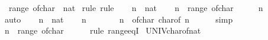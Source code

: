\begin{isabellebody}
\ \ {\isachardoublequoteopen}range\ of{\isacharunderscore}{\kern0pt}char\ {\isacharequal}{\kern0pt}\ {\isacharbraceleft}{\kern0pt}{}{\isacharcolon}{\kern0pt}{\isacharcolon}{\kern0pt}nat{\isachardot}{\kern0pt}{\isachardot}{\kern0pt}{\isacharless}{\kern0pt}{}{}{}{\isacharbraceright}{\kern0pt}{\isachardoublequoteclose}\isanewline
%
\isadelimproof
%
\endisadelimproof
%
\isatagproof
{}\isamarkupfalse%
\ {\isacharparenleft}{\kern0pt}rule{\isacharsemicolon}{\kern0pt}\ rule{\isacharparenright}{\kern0pt}\isanewline
\ \ \isamarkupfalse%
\ n\ {\isacharcolon}{\kern0pt}{\isacharcolon}{\kern0pt}\ nat\isanewline
\ \ \isamarkupfalse%
\ {\isachardoublequoteopen}n\ {\isasymin}\ range\ of{\isacharunderscore}{\kern0pt}char{\isachardoublequoteclose}\isanewline
\ \ \isamarkupfalse%
\ \isamarkupfalse%
\ {\isachardoublequoteopen}n\ {\isasymin}\ {\isacharbraceleft}{\kern0pt}{}{\isachardot}{\kern0pt}{\isachardot}{\kern0pt}{\isacharless}{\kern0pt}{}{}{}{\isacharbraceright}{\kern0pt}{\isachardoublequoteclose}\isanewline
\ \ \ \ \isamarkupfalse%
\ auto\isanewline
{}\isamarkupfalse%
\isanewline
\ \ \isamarkupfalse%
\ n\ {\isacharcolon}{\kern0pt}{\isacharcolon}{\kern0pt}\ nat\isanewline
\ \ \isamarkupfalse%
\ {\isachardoublequoteopen}n\ {\isasymin}\ {\isacharbraceleft}{\kern0pt}{}{\isachardot}{\kern0pt}{\isachardot}{\kern0pt}{\isacharless}{\kern0pt}{}{}{}{\isacharbraceright}{\kern0pt}{\isachardoublequoteclose}\isanewline
\ \ \isamarkupfalse%
\ \isamarkupfalse%
\ {\isachardoublequoteopen}n\ {\isacharequal}{\kern0pt}\ of{\isacharunderscore}{\kern0pt}char\ {\isacharparenleft}{\kern0pt}char{\isacharunderscore}{\kern0pt}of\ n{\isacharparenright}{\kern0pt}{\isachardoublequoteclose}\isanewline
\ \ \ \ \isamarkupfalse%
\ simp\isanewline
\ \ \isamarkupfalse%
\ \isamarkupfalse%
\ {\isachardoublequoteopen}n\ {\isasymin}\ range\ of{\isacharunderscore}{\kern0pt}char{\isachardoublequoteclose}\isanewline
\ \ \ \ \isamarkupfalse%
\ {\isacharparenleft}{\kern0pt}rule\ range{\isacharunderscore}{\kern0pt}eqI{\isacharparenright}{\kern0pt}\isanewline
{}\isamarkupfalse%
%
\endisatagproof
{\isafoldproof}%
%
\isadelimproof
\isanewline
%
\endisadelimproof
\isanewline
{}\isamarkupfalse%
\ UNIV{\isacharunderscore}{\kern0pt}char{\isacharunderscore}{\kern0pt}of{\isacharunderscore}{\kern0pt}nat{\isacharcolon}{\kern0pt}\isanewline

\end{isabellebody}

